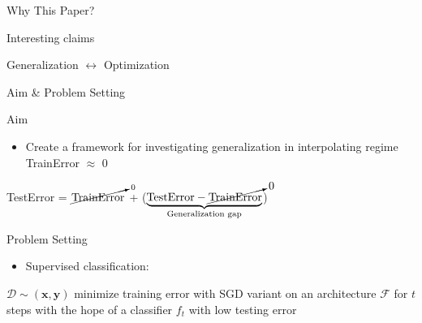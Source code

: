 \documentclass[aspectratio=169]{beamer}
\author{\authorlabel}
\renewcommand{\cite}[1]{\footnote<.->[frame]{\fullcite{#1}}}
\newcommand{\mysubtitle}{\color{Pink}\Large{\textbf{The Deep Bootstrap Framework:Good Learners Are Good Offline Generalizers}}}
\begin{document}
{

\def\beamer@entrycode{\vspace*{-\headheight}}
}



\begin{frame}{Why This Paper?}
	\centering
	\begin{minipage}{0.5\textwidth}
			\centering
			 Interesting claims	
			 
			 \vspace{1cm}
			 Generalization $\leftrightarrow$ Optimization
	\end{minipage}
\end{frame}

\begin{frame}{Aim \& Problem Setting}
\begin{block}{\color{White} Aim}
	\begin{itemize}
		\item Create a framework for investigating generalization in interpolating regime TrainError $\approx$ 0
	\end{itemize}
		\centering
			TestError = $\cancelto{0}{\text{TrainError}}$ + ($\underbrace{\text{TestError}-\cancelto{0}{\text{TrainError}}}_{\text{Generalization gap}}$)
\end{block}
\begin{block}{\color{White} Problem Setting}
	\begin{itemize}
		\item Supervised classification:
 	\end{itemize}
 		\centering
 		$\mathcal{D}\sim(\mathbold{x},\mathbold{y})$ minimize training error with SGD variant on an architecture $\mathcal{F}$ for $t$ steps with the hope of a classifier $f_t$ with low testing error
\end{block}
\end{frame}
\end{document}
